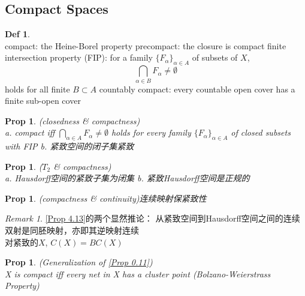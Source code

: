 \documentclass[hidelinks]{article}
\theoremstyle{definition}
\newtheorem*{defin}{Def}
\theoremstyle{plain}
\newtheorem{proposition}[theorem]{Prop}
\theoremstyle{remark}
\newtheorem*{remark}{Remark}
\begin{document}
\subsection{Compact Spaces}
\begin{defin}~\\
compact: the Heine-Borel property \newline
precompact: the closure is compact \newline
finite intersection property (FIP): for a family $\{F_\alpha\}_{\alpha \in A}$ of subsets of $X$,
\[
\bigcap_{\alpha \in B}F_\alpha \neq \emptyset
\]
holds for all finite $B\subset A$ \newline
countably compact: every countable open cover has a finite sub-open cover
\end{defin}

\begin{proposition}(closedness \& compactness)~\\
a. compact iff $\bigcap_{\alpha \in A}F_\alpha \neq \emptyset$ holds for every family $\{F_\alpha\}_{\alpha \in A}$ of closed subsets with FIP\newline
b. 紧致空间的闭子集紧致
\end{proposition}

\begin{proposition}($T_2$ \& compactness)~\\
a. Hausdorff空间的紧致子集为闭集\newline
b. 紧致Hausdorff空间是正规的
\end{proposition}

\begin{proposition}(compactness \& continuity)\label{Prop 4.13}
连续映射保紧致性
\end{proposition}

\begin{remark}
\autoref{Prop 4.13}的两个显然推论：\newline
\indent 从紧致空间到Hausdorff空间之间的连续双射是同胚映射，亦即其逆映射连续 \\
\indent 对紧致的$X$, $C(X)=BC(X)$
\end{remark}

\begin{proposition} (Generalization of \autoref{Prop 0.11})~\\
X is compact iff every net in X has a cluster point (Bolzano-Weierstrass Property)
\end{proposition}
\end{document}
